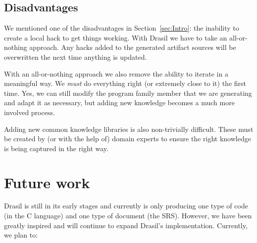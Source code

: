 \documentclass[preprint, 10pt]{sigplanconf}
\begin{document}
\subsection{Disadvantages}
\label{subsec:disadvantages}

We mentioned one of the disadvantages in Section~\ref{sec:Intro}: the inability
to create a local hack to get things working. With Drasil we have to take an
all-or-nothing approach. Any hacks added to the generated artifact sources will
be overwritten the next time anything is updated.

With an all-or-nothing approach we also remove the ability to iterate in a
meaningful way. We \emph{must} do everything right (or extremely close to it)
the first time. Yes, we can still modify the program family member that we are
generating and adapt it as necessary, but adding new knowledge becomes a much
more involved process.

Adding new common knowledge libraries is also non-trivially difficult. These
must be created by (or with the help of) domain experts to ensure the right
knowledge is being captured in the right way.

\section{Future work}
\label{sec:fw}

Drasil is still in its early stages and currently is only producing one type of
code (in the C language) and one type of document (the SRS). However, we have
been greatly inspired and will continue to expand Drasil's implementation.
Currently, we plan to:
\end{document}
